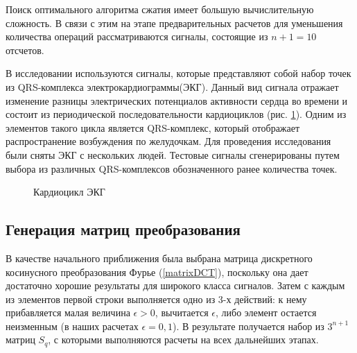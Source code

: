 \documentclass[11pt, oneside, a4paper]{article}
\begin{document}
Поиск оптимального алгоритма сжатия имеет большую вычислительную сложность. В связи с этим на этапе предварительных расчетов для уменьшения количества операций рассматриваются сигналы, состоящие из $n+1=10$ отсчетов. 

В исследовании используются сигналы, которые представляют собой набор точек из QRS-комплекса электрокардиограммы(ЭКГ). Данный вид сигнала отражает изменение разницы электрических потенциалов активности сердца во времени и состоит из периодической последовательности кардиоциклов (рис. \ref{qsr-complex}). Одним из элементов такого цикла является QRS-комплекс, который отображает распространение возбуждения по желудочкам. Для проведения исследования были сняты ЭКГ с нескольких людей. Тестовые сигналы сгенерированы путем выбора из различных QRS-комплексов обозначенного ранее количества точек.

\begin{figure}[h]
	\caption{Кардиоцикл ЭКГ}
	\label{qsr-complex}
\end{figure}

\subsection{Генерация матриц преобразования}

В качестве начального приближения была выбрана матрица дискретного косинусного преобразования Фурье (\ref{matrixDCT}), поскольку она дает достаточно хорошие результаты для широкого класса сигналов. Затем с каждым из элементов первой строки выполняется одно из 3-х действий: к нему прибавляется малая величина $\epsilon>0$, вычитается $\epsilon$, либо элемент остается неизменным (в наших расчетах $\epsilon=0,1$). В результате получается набор из $3^{n+1}$ матриц $S_q$, с которыми выполняются расчеты на всех дальнейших этапах.
\end{document}
